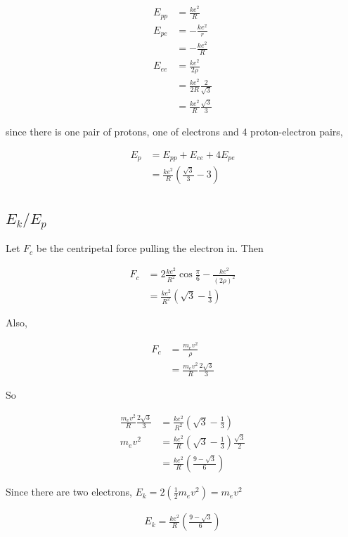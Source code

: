 \documentclass{article}
\begin{document}
\begin{align*}
E_{pp} &= \frac{ke^2}{R} \\
E_{pe} &= -\frac{ke^2}{r} \\
&= -\frac{ke^2}{R} \\
E_{ee} &= \frac{ke^2}{2\rho} \\
&= \frac{ke^2}{2R} \frac{2}{\sqrt 3} \\
&= \frac{ke^2}{R} \frac{\sqrt 3}{3}
\end{align*}

since there is one pair of protons, one of electrons and 4 proton-electron pairs,

\begin{align*}
E_p &= E_{pp} + E_{ee} + 4 E_{pe} \\
&= \frac{ke^2}{R} \left(\frac{\sqrt 3}{3} - 3\right)
\end{align*}

\subsection{$E_k/E_p$}

Let $F_c$ be the centripetal force pulling the electron in. Then

\begin{align*}
F_c &= 2 \frac{ke^2}{R^2} \cos\frac{\pi}{6} - \frac{ke^2}{(2\rho)^2} \\
&= \frac{ke^2}{R^2}\left(\sqrt{3} - \frac{1}{3}\right)
\end{align*}

Also,

\begin{align*}
F_c &= \frac{m_e v^2}{\rho} \\
&= \frac{m_e v^2}{R} \frac{2\sqrt 3}{3}
\end{align*}

So

\begin{align*}
\frac{m_e v^2}{R} \frac{2\sqrt 3}{3} &= \frac{ke^2}{R^2}\left(\sqrt{3} - \frac{1}{3}\right) \\
m_e v^2 &= \frac{ke^2}{R}\left(\sqrt{3} - \frac{1}{3}\right) \frac{\sqrt 3}{2} \\
&= \frac{ke^2}{R}\left(\frac{9 - \sqrt 3}{6}\right)
\end{align*}

Since there are two electrons, $E_k = 2 (\frac{1}{2} m_e v^2) = m_e v^2$

\begin{align*}
E_k = \frac{ke^2}{R}\left(\frac{9 - \sqrt 3}{6}\right)
\end{align*}
\end{document}
